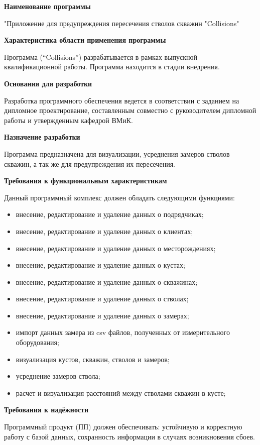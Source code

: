 \textbf{Наименование программы}

"Приложение для предупреждения пересечения стволов скважин "Collisions"

\textbf{Характеристика области применения программы}

Программа (“Collisions”) разрабатывается в рамках выпускной квалификационной работы. Программа находится в стадии внедрения.

\textbf{Основания для разработки}

Разработка программного обеспечения ведется в соответствии с заданием на дипломное проектирование, составленным совместно с
руководителем дипломной работы и утвержденным кафедрой ВМиК.

\textbf{Назначение разработки}

Программа предназначена для визуализации, усреднения замеров стволов скважин, а так же для предупреждения их пересечения.

\textbf{Требования к функциональным характеристикам}

Данный программный комплекс должен обладать следующими функциями:
\begin{itemize}
  \item внесение, редактирование и удаление данных о подрядчиках;
  \item внесение, редактирование и удаление данных о клиентах;
  \item внесение, редактирование и удаление данных о месторождениях;
  \item внесение, редактирование и удаление данных о кустах;
  \item внесение, редактирование и удаление данных о скважинах;
  \item внесение, редактирование и удаление данных о стволах;
  \item внесение, редактирование и удаление данных о замерах;
  \item импорт данных замера из csv файлов, полученных от измерительного оборудования;
  \item визуализация кустов, скважин, стволов и замеров;
  \item усреднение замеров ствола;
  \item расчет и визуализация расстояний между стволами скважин в кусте;
\end{itemize}

\textbf{Требования к надёжности}

Программный продукт (ПП) должен обеспечивать: устойчивую и корректную работу с базой данных,
сохранность информации в случаях возникновения сбоев.

